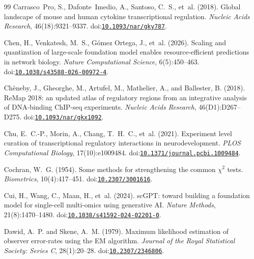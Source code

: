 \documentclass[11pt,a4paper]{article}
\begin{document}
\begin{thebibliography}{99}
Carrasco Pro, S., Dafonte Imedio, A., Santoso, C.~S., et~al. (2018).
\newblock Global landscape of mouse and human cytokine transcriptional regulation.
\newblock \emph{Nucleic Acids Research}, 46(18):9321--9337.
\newblock doi:\href{https://doi.org/10.1093/nar/gky787}{\nolinkurl{10.1093/nar/gky787}}.

Chen, H., Venkatesh, M.~S., G{\'o}mez Ortega, J., et~al. (2026).
\newblock Scaling and quantization of large-scale foundation model enables resource-efficient predictions in network biology.
\newblock \emph{Nature Computational Science}, 6(5):450--463.
\newblock doi:\href{https://doi.org/10.1038/s43588-026-00972-4}{\nolinkurl{10.1038/s43588-026-00972-4}}.

Ch{\`e}neby, J., Gheorghe, M., Artufel, M., Mathelier, A., and Ballester, B. (2018).
\newblock ReMap 2018: an updated atlas of regulatory regions from an integrative analysis of DNA-binding ChIP-seq experiments.
\newblock \emph{Nucleic Acids Research}, 46(D1):D267--D275.
\newblock doi:\href{https://doi.org/10.1093/nar/gkx1092}{\nolinkurl{10.1093/nar/gkx1092}}.

Chu, E.~C.-P., Morin, A., Chang, T.~H.~C., et~al. (2021).
\newblock Experiment level curation of transcriptional regulatory interactions in neurodevelopment.
\newblock \emph{PLOS Computational Biology}, 17(10):e1009484.
\newblock doi:\href{https://doi.org/10.1371/journal.pcbi.1009484}{\nolinkurl{10.1371/journal.pcbi.1009484}}.

Cochran, W.~G. (1954).
\newblock Some methods for strengthening the common $\chi^2$ tests.
\newblock \emph{Biometrics}, 10(4):417--451.
\newblock doi:\href{https://doi.org/10.2307/3001616}{\nolinkurl{10.2307/3001616}}.

Cui, H., Wang, C., Maan, H., et~al. (2024).
\newblock sc{GPT}: toward building a foundation model for single-cell multi-omics using generative {AI}.
\newblock \emph{Nature Methods}, 21(8):1470--1480.
\newblock doi:\href{https://doi.org/10.1038/s41592-024-02201-0}{\nolinkurl{10.1038/s41592-024-02201-0}}.

Dawid, A.~P. and Skene, A.~M. (1979).
\newblock Maximum likelihood estimation of observer error-rates using the {EM} algorithm.
\newblock \emph{Journal of the Royal Statistical Society: Series C}, 28(1):20--28.
\newblock doi:\href{https://doi.org/10.2307/2346806}{\nolinkurl{10.2307/2346806}}.


\end{thebibliography}
\end{document}
